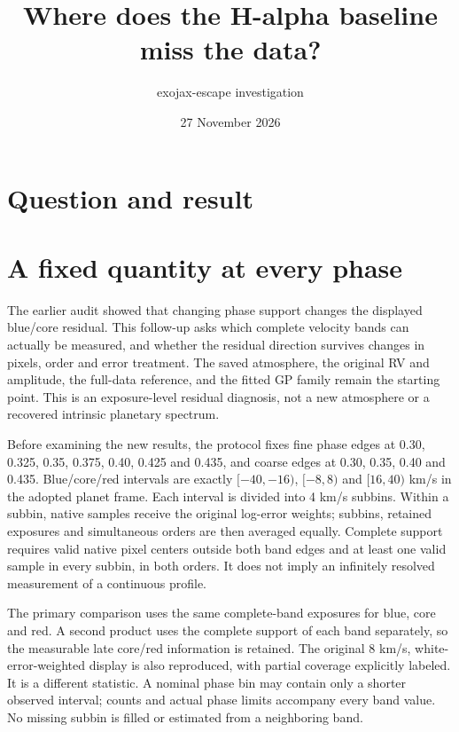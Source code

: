 \documentclass[11pt]{article}
\title{Where does the H-alpha baseline miss the data?}
\author{exojax-escape investigation}
\date{27 November 2026}
\begin{document}
\maketitle
\section{Question and result}


\section{A fixed quantity at every phase}
The earlier audit showed that changing phase support changes the displayed
blue/core residual. This follow-up asks which complete velocity bands can
actually be measured, and whether the residual direction survives changes
in pixels, order and error treatment. The saved atmosphere, the original
RV and amplitude, the full-data reference, and the fitted GP family remain
the starting point. This is an exposure-level residual diagnosis, not a
new atmosphere or a recovered intrinsic planetary spectrum.

Before examining the new results, the protocol fixes fine phase edges
at 0.30, 0.325, 0.35, 0.375, 0.40, 0.425 and 0.435, and coarse edges
at 0.30, 0.35, 0.40 and 0.435. Blue/core/red intervals are exactly
$[-40,-16)$, $[-8,8)$ and $[16,40)$ km/s in the adopted planet frame.
Each interval is divided into 4 km/s subbins. Within a subbin, native
samples receive the original log-error weights; subbins, retained exposures
and simultaneous orders are then averaged equally. Complete support requires
valid native pixel centers outside both band edges and at least one valid
sample in every subbin, in both orders. It does not imply an infinitely
resolved measurement of a continuous profile.

The primary comparison uses the same complete-band exposures for blue, core
and red. A second product uses the complete support of each band separately,
so the measurable late core/red information is retained. The original
8 km/s, white-error-weighted display is also reproduced, with partial
coverage explicitly labeled. It is a different statistic. A nominal phase
bin may contain only a shorter observed interval; counts and actual phase
limits accompany every band value. No missing subbin is filled or estimated
from a neighboring band.
\end{document}
